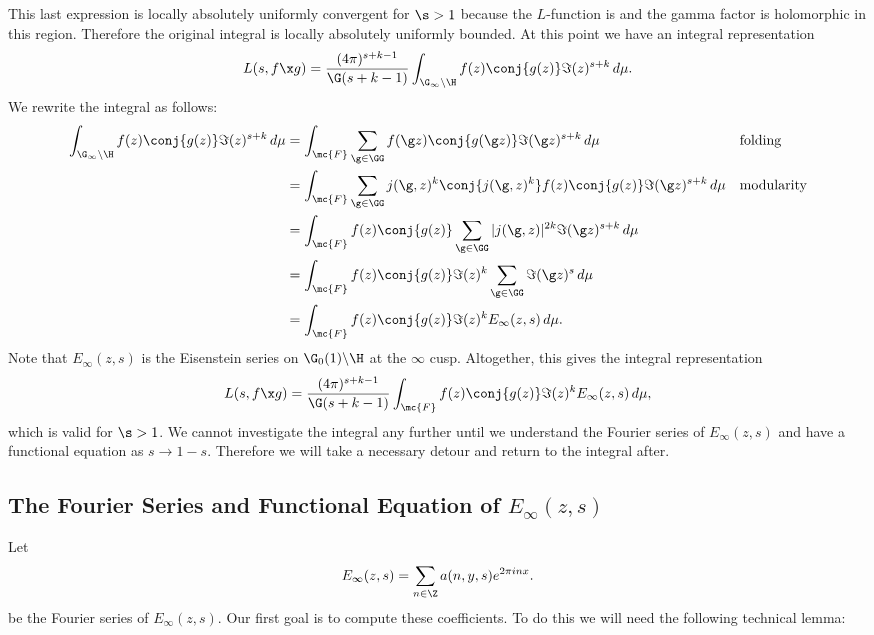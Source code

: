       This last expression is locally absolutely uniformly convergent for $\s > 1$ because the $L$-function is and the gamma factor is holomorphic in this region. Therefore the original integral is locally absolutely uniformly bounded. At this point we have an integral representation
      \[
        L(s,f \x g) = \frac{(4\pi)^{s+k-1}}{\G(s+k-1)}\int_{\G_{\infty}\backslash\H}f(z)\conj{g(z)}\Im(z)^{s+k}\,d\mu.
      \]
      We rewrite the integral as follows:
      \begin{align*}
        \int_{\G_{\infty}\backslash\H}f(z)\conj{g(z)}\Im(z)^{s+k}\,d\mu &= \int_{\mc{F}}\sum_{\g \in \GG}f(\g z)\conj{g(\g z)}\Im(\g z)^{s+k}\,d\mu && \text{folding} \\
        &= \int_{\mc{F}}\sum_{\g \in \GG}j(\g,z)^{k}\conj{j(\g,z)^{k}}f(z)\conj{g(z)}\Im(\g z)^{s+k}\,d\mu && \text{modularity} \\
        &= \int_{\mc{F}}f(z)\conj{g(z)}\sum_{\g \in \GG}|j(\g,z)|^{2k}\Im(\g z)^{s+k}\,d\mu \\
        &= \int_{\mc{F}}f(z)\conj{g(z)}\Im(z)^{k}\sum_{\g \in \GG}\Im(\g z)^{s}\,d\mu \\
        &= \int_{\mc{F}}f(z)\conj{g(z)}\Im(z)^{k}E_{\infty}(z,s)\,d\mu.
      \end{align*}
      Note that $E_{\infty}(z,s)$ is the Eisenstein series on $\G_{0}(1)\backslash\H$ at the $\infty$ cusp. Altogether, this gives the integral representation
      \begin{equation}\label{equ:Rankin-Selberg_integral-reresentation}
        L(s,f \x g) =  \frac{(4\pi)^{s+k-1}}{\G(s+k-1)}\int_{\mc{F}}f(z)\conj{g(z)}\Im(z)^{k}E_{\infty}(z,s)\,d\mu,
      \end{equation}
      which is valid for $\s > 1$. We cannot investigate the integral any further until we understand the Fourier series of $E_{\infty}(z,s)$ and have a functional equation as $s \to 1-s$. Therefore we will take a necessary detour and return to the integral after.
    \subsection*{The Fourier Series and Functional Equation of \texorpdfstring{$E_{\infty}(z,s)$}{E_{\infty}(z,s)}}
      Let
      \[
        E_{\infty}(z,s) = \sum_{n \in \Z}a(n,y,s)e^{2\pi inx}.
      \]
      be the Fourier series of $E_{\infty}(z,s)$. Our first goal is to compute these coefficients. To do this we will need the following technical lemma:

